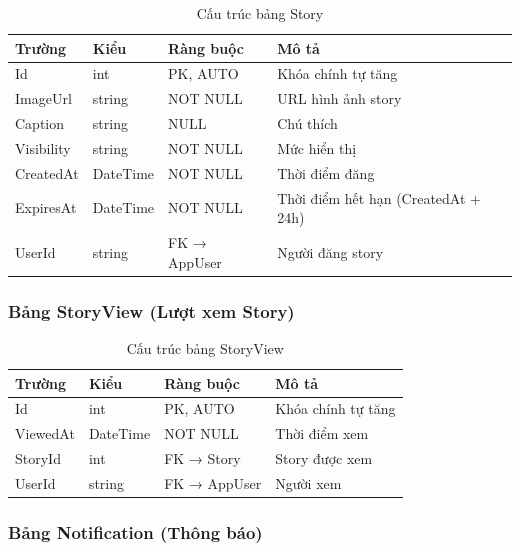 \documentclass[a4paper]{article}
\begin{document}
\begin{table}[h!]
\centering
\caption{Cấu trúc bảng Story}
\begin{tabularx}{\textwidth}{|l|l|l|X|}
\hline
\textbf{Trường} & \textbf{Kiểu} & \textbf{Ràng buộc} & \textbf{Mô tả} \\
\hline
Id & int & PK, AUTO & Khóa chính tự tăng \\
\hline
ImageUrl & string & NOT NULL & URL hình ảnh story \\
\hline
Caption & string & NULL & Chú thích \\
\hline
Visibility & string & NOT NULL & Mức hiển thị \\
\hline
CreatedAt & DateTime & NOT NULL & Thời điểm đăng \\
\hline
ExpiresAt & DateTime & NOT NULL & Thời điểm hết hạn (CreatedAt + 24h) \\
\hline
UserId & string & FK → AppUser & Người đăng story \\
\hline
\end{tabularx}
\end{table}

\subsubsection{Bảng StoryView (Lượt xem Story)}

\begin{table}[h!]
\centering
\caption{Cấu trúc bảng StoryView}
\begin{tabularx}{\textwidth}{|l|l|l|X|}
\hline
\textbf{Trường} & \textbf{Kiểu} & \textbf{Ràng buộc} & \textbf{Mô tả} \\
\hline
Id & int & PK, AUTO & Khóa chính tự tăng \\
\hline
ViewedAt & DateTime & NOT NULL & Thời điểm xem \\
\hline
StoryId & int & FK → Story & Story được xem \\
\hline
UserId & string & FK → AppUser & Người xem \\
\hline
\end{tabularx}
\end{table}

\subsubsection{Bảng Notification (Thông báo)}
\end{document}
